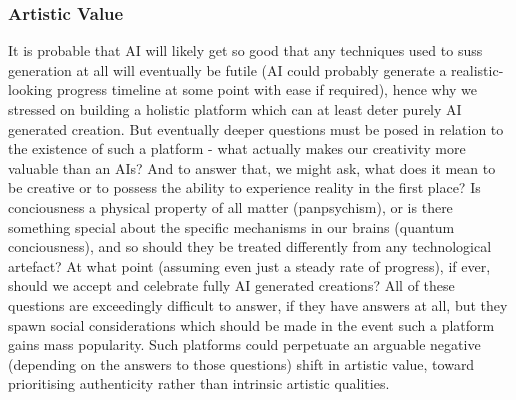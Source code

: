 \documentclass[12pt,a4paper]{article}
\begin{document}
\subsubsection{Artistic Value}
It is probable that AI will likely get so good that any techniques used to suss generation at all will eventually be futile (AI could probably generate a realistic-looking progress timeline at some point with ease if required), hence why we stressed on building a holistic platform which can at least deter purely AI generated creation. But eventually deeper questions must be posed in relation to the existence of such a platform - what actually makes our creativity more valuable than an AIs? And to answer that, we might ask, what does it mean to be creative or to possess the ability to experience reality in the first place? Is conciousness a physical property of all matter (panpsychism), or is there something special about the specific mechanisms in our brains (quantum conciousness), and so should they be treated differently from any technological artefact? At what point (assuming even just a steady rate of progress), if ever, should we accept and celebrate fully AI generated creations? All of these questions are exceedingly difficult to answer, if they have answers at all, but they spawn social considerations which should be made in the event such a platform gains mass popularity. Such platforms could perpetuate an arguable negative (depending on the answers to those questions) shift in artistic value, toward prioritising authenticity rather than intrinsic artistic qualities.
\end{document}
